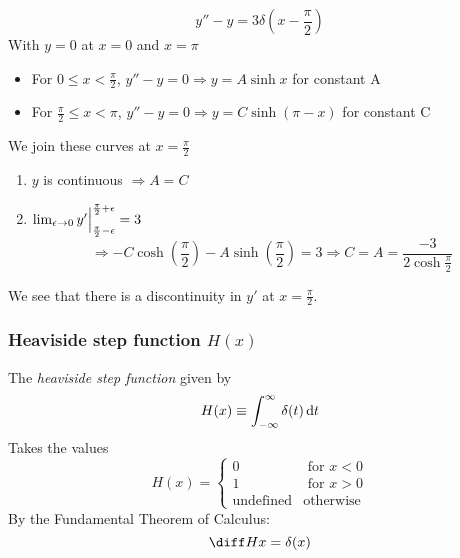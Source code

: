 \documentclass{article}
\begin{document}
\begin{eg}
    \[
        y'' - y = 3 \delta(x - \frac{\pi}{2})  
    \]
    With $y = 0$ at $x = 0$ and $x = \pi$
    \begin{itemize}
        \item For $0 \leq x < \frac{\pi}{2}$, $y'' - y = 0 \Rightarrow y = A \sinh x$ for constant A
        \item For $\frac{\pi}{2} \leq x < \pi$, $y'' - y = 0 \Rightarrow y = C \sinh (\pi - x)$ for constant C
    \end{itemize}
    We join these curves at $x = \frac{\pi}{2}$
    \begin{enumerate}
        \item $y$ is continuous $\Rightarrow A = C$
        \item $\lim_{\epsilon \rightarrow 0} y' \Big{|}_{\frac{\pi}{2} - \epsilon}^{\frac{\pi}{2} + \epsilon} = 3$
        \[
            \Rightarrow -C \cosh(\frac{\pi}{2}) - A \sinh(\frac{\pi}{2}) = 3 \Rightarrow C = A = \frac{-3}{2 \cosh{\frac{\pi}{2}}} 
        \]
    \end{enumerate}
    
    \begin{center}
    \end{center}

    We see that there is a discontinuity in $y'$ at $x = \frac{\pi}{2}$.
\end{eg}
\subsubsection{Heaviside step function $H(x)$}
\begin{defi}
    The \emph{heaviside step function} given by
    \[
        H(x) \equiv \int_{-\infty}^{\infty} {\delta(t) \mathop{}\!\mathrm{d} t} 
    \]
    Takes the values
    \[
        H(x) = \begin{cases}
            0 & \text{ for } x < 0 \\
            1 & \text{ for } x > 0 \\
            \text{undefined} & \text{otherwise}
        \end{cases}
    \]  
    By the Fundamental Theorem of Calculus:
    \[
        \diff Hx = \delta(x)
    \]
\end{defi}
\end{document}

